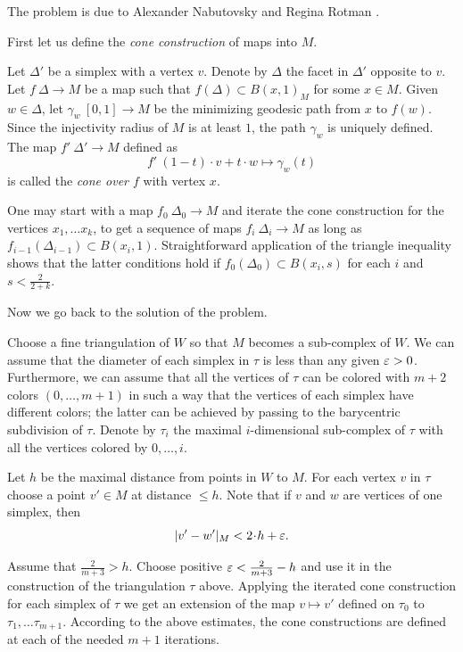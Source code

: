 The problem is due to 
Alexander Nabutovsky 
and Regina Rotman \cite{nabutovsky-rotman}.


First let us define the {}\emph{cone construction} of maps into $M$.

Let $\Delta'$ be a simplex 
with a vertex $v$.
Denote by $\Delta$ the facet in $\Delta'$ opposite to $v$.
Let $f\:\Delta\to M$ be a map such that $f(\Delta)\subset B(x,1)_M$ for some $x \in M$.
Given $w\in \Delta$, let $\gamma_w\:[0,1]\to M$ be the minimizing geodesic path from $x$ to  $f(w)$.
Since the injectivity radius of $M$ is at least $1$, the path $\gamma_w$ is uniquely defined.
The map $f'\:\Delta'\to M$ defined as 
\[f'\:(1-t)\cdot v+t\cdot w\mapsto \gamma_w(t)\] 
is called the {}\emph{cone over $f$} with vertex $x$. 

One may start with a map $f_0\:\Delta_0\to M$ and iterate the cone construction for the vertices $x_1,\dots x_k$,
to get a sequence of maps $f_i\:\Delta_i\to M$
as long as $f_{i-1}(\Delta_{i-1})\subset B(x_i,1)$.
Straightforward application of the triangle inequality 
shows that the latter conditions hold if 
$f_0(\Delta_0)\subset B(x_i,s)$ for each $i$ and $s<\tfrac2{2+k}$.

\medskip

Now we go back to the solution of the problem.

Choose a fine triangulation of $W$ so that $M$ becomes a sub-complex of $W$.
We can assume that the diameter of each simplex in $\tau$ is less than any given
$\varepsilon>0$.
Furthermore, we can assume that all the vertices of $\tau$ can be colored with $m+2$ colors $(0,\dots, m+1)$
in such a way that the vertices of each simplex 
have different colors;
the latter can be achieved by passing to the barycentric subdivision of $\tau$.
Denote by $\tau_i$ the maximal $i$-dimensional sub-complex of $\tau$ 
with all the vertices colored by $0,\dots, i$.

Let $h$ be the maximal distance from points in $W$ to $M$.
For each vertex $v$ in $\tau$ 
choose a point $v'\in M$ at distance $\le h$.
Note that 
if $v$ and $w$ are vertices of one simplex,
then
\[|v'-w'|_M<2\cdot h+\eps.\]

Assume that $\tfrac{2}{m+3}>h$.
Choose positive $\varepsilon<\tfrac{2}{m+3}-h$ and use it in the construction of the triangulation $\tau$ above.
Applying the iterated cone construction for each simplex of $\tau$
we get an extension of the map $v\mapsto v'$ defined on $\tau_0$ to $\tau_1,\dots\tau_{m+1}$.
According to the above estimates, the cone constructions are defined at each of the needed $m+1$ iterations.

